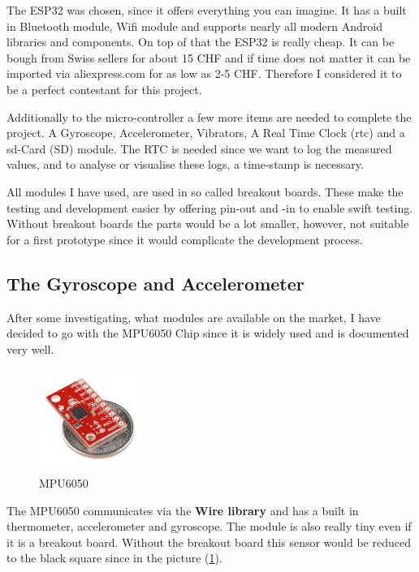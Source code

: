 The \gls{ESP32} was chosen, since it offers everything you can imagine. It has a built in Bluetooth module, Wifi module and supports nearly all modern Android libraries and components. On top of that the ESP32 is really cheap. It can be bough from Swiss sellers for about 15 CHF and if time does not matter it can be imported via aliexpress.com for as low as 2-5 CHF. Therefore I considered it to be a perfect contestant for this project. 

Additionally to the micro-controller a few more items are needed to complete the project. A Gyroscope, Accelerometer, Vibrators, A Real Time Clock (\acrshort{rtc}) and a \acrshort{sd}-Card (\gls{SD}) module. The \gls{RTC} is needed since we want to log the measured values, and to analyse or visualise these logs, a time-stamp is necessary. 

All modules I have used, are used in so called breakout boards. These make the testing and development easier by offering pin-out and -in to enable swift testing. Without breakout boards the parts would be a lot smaller, however, not suitable for a first prototype since it would complicate the development process.

\subsection{The Gyroscope and Accelerometer}

After some investigating, what modules are available on the market, I have decided to go with the 
\gls{MPU6050} Chip since it is widely used and is documented very well. 

\begin{figure}
  \begin{center}
\includegraphics[width=0.3\textwidth]{images/MPU_6050.jpg}
  \end{center}
  \caption{MPU6050}
  \label{fig:MPU6050}
\end{figure}

The MPU6050 communicates via the \textbf{Wire library} and has a built in thermometer, accelerometer and gyroscope. The module is also really tiny even if it is a breakout board.
Without the breakout board this sensor would be reduced to the black square since in the picture  (\ref{fig:MPU6050}).

